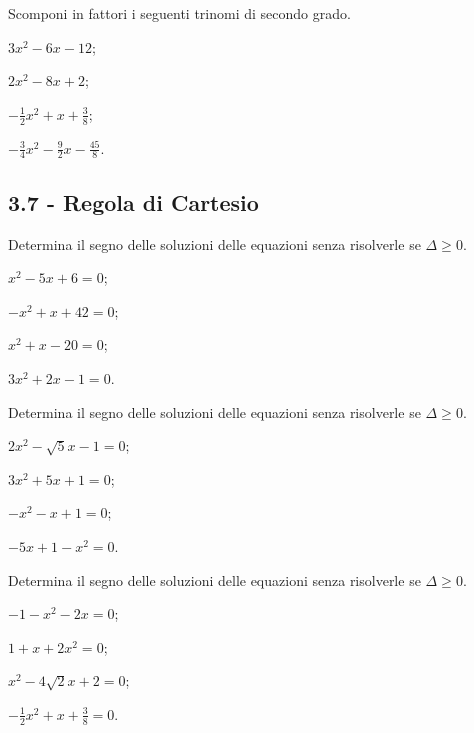 \begin{esercizio}[\Ast]
 \label{ese:3.87}
Scomponi in fattori i seguenti trinomi di secondo grado.
\begin{multicols}{2}
\begin{enumeratea}
\item $3 x^{2}-6 x-12$;
\item $2 x^{2}-8 x + 2$;
\item $- \frac{1}{2} x^{2} + x + \frac{3}{8}$;
\item $- \frac{3}{4} x^{2}-\frac{9}{2} x - \frac{45}{8}$.
\end{enumeratea}
\end{multicols}
\end{esercizio}

\subsection*{3.7 - Regola di Cartesio}

\begin{esercizio}
 \label{ese:3.88}
Determina il segno delle soluzioni delle equazioni senza risolverle se $\Delta \geq 0$.
\begin{multicols}{2}
\begin{enumeratea}
\item $x^{2}-5 x + 6=0$;
\item $- x^{2} + x + 42=0$;
\item $x^{2} + x-20=0$;
\item $3 x^{2} + 2 x-1=0$.
\end{enumeratea}
\end{multicols}
\end{esercizio}

\begin{esercizio}
\label{ese:3.89}
Determina il segno delle soluzioni delle equazioni senza risolverle se $\Delta \geq 0$.
\begin{multicols}{2}
\begin{enumeratea}
\item $2 x^{2}-\sqrt{5} x-1=0$;
\item $3 x^{2} + 5 x + 1 = 0$;
\item $- x^{2}-x + 1 = 0$;
\item $- 5 x + 1-x^{2} = 0$.
\end{enumeratea}
\end{multicols}
\end{esercizio}

\begin{esercizio}
\label{ese:3.90}
Determina il segno delle soluzioni delle equazioni senza risolverle se $\Delta \geq 0$.
\begin{multicols}{2}
\begin{enumeratea}
\item $- 1-x^{2}-2 x = 0$;
\item $1 + x + 2 x^{2} = 0$;
\item $x^{2}-4 \sqrt{2} x + 2 = 0$;
\item $- \frac{1}{2} x^{2} + x + \frac{3}{8} = 0$.
\end{enumeratea}
\end{multicols}
\end{esercizio}

